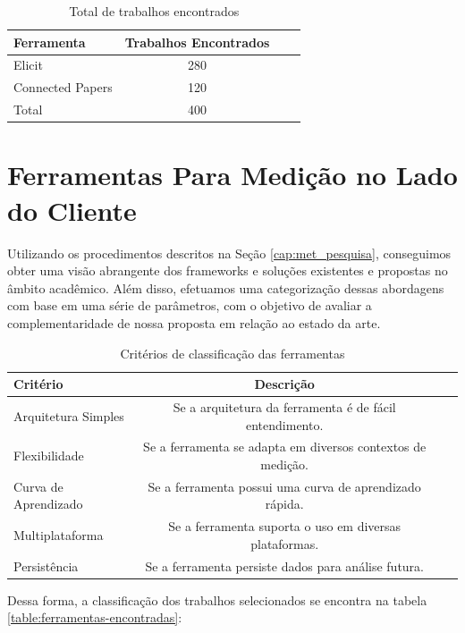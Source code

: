 \documentclass[12pt]{tcc}
\begin{document}
	\begin{table}[!ht]
		\centering
		\caption{Total de trabalhos encontrados}
		\begin{tabular}{l  c L{1.5cm} R{1.5cm}}
			\toprule
			\textbf{Ferramenta} & \textbf{Trabalhos Encontrados} \\
			\midrule
			Elicit  &  280  \\
			Connected Papers  &  120  \\
			\midrule
			Total  &  400  \\
			\bottomrule
		\end{tabular}
		\label{tab:trabalhos-encontrados}
	\end{table}


	\section{Ferramentas Para Medição no Lado do Cliente}

	Utilizando os procedimentos descritos na Seção \ref{cap:met_pesquisa}, conseguimos obter uma visão abrangente dos frameworks e soluções existentes e propostas no âmbito acadêmico.
	Além disso, efetuamos uma categorização dessas abordagens com base em uma série de parâmetros, com o objetivo de avaliar a complementaridade de nossa proposta em relação ao estado da arte.


	\begin{table}[!ht]
		\centering
		\caption{Critérios de classificação das ferramentas}
		\begin{tabular}{l c L{1.5cm} R{1.5cm}}
			\toprule
			\textbf{Critério} & \textbf{Descrição}\\
			\midrule 
			Arquitetura Simples & Se a arquitetura da ferramenta é de fácil entendimento.\\
			Flexibilidade&Se a ferramenta se adapta em diversos contextos de medição.\\
			Curva de Aprendizado&Se a ferramenta possui uma curva de aprendizado rápida.\\
			Multiplataforma&Se a ferramenta suporta o uso em diversas plataformas.\\
			Persistência&Se a ferramenta persiste dados para análise futura.\\
			\bottomrule
		\end{tabular}
		\label{tab:string-busca-connected-papers}
	\end{table}


	\par Dessa forma, a classificação dos trabalhos selecionados se encontra na tabela \ref{table:ferramentas-encontradas}:
\end{document}
